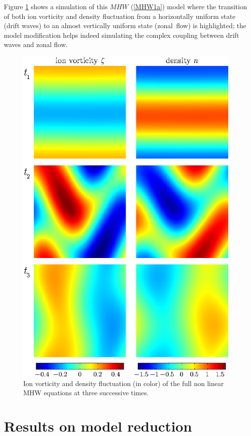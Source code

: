 \documentclass[12pt,lot, lof]{puthesis}
\begin{document}
Figure \ref{coupling} shows a simulation of this $MHW$ (\ref{MHW1a}) model where the transition of both ion vorticity and density fluctuation from a horizontally uniform state (drift waves) to an almost  vertically uniform state (zonal~flow) is highlighted;  the model modification helps indeed simulating the complex coupling between drift waves and zonal flow. 
\begin{figure}[htb]
\centering
  \includegraphics{video}
  \caption{Ion vorticity and density fluctuation (in color) of the full non linear MHW equations at three successive times.}
\label{coupling}
\end{figure}

\section{Results on model reduction}
\end{document}
